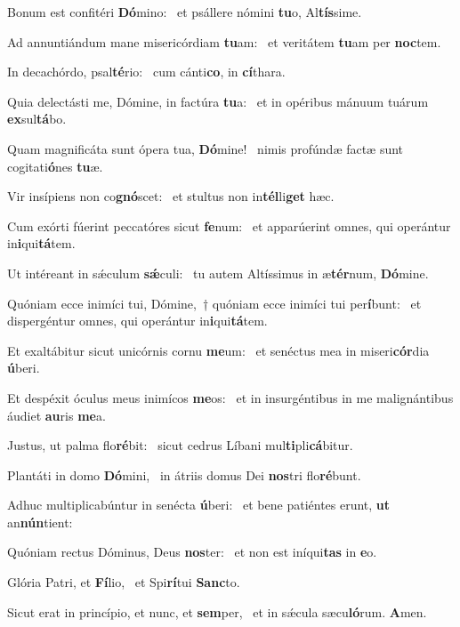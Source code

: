 \item Bonum est confitéri \textbf{Dó}mino:~\psstar{} et psállere nómini \textbf{tu}o, Al\textbf{tís}sime.

\item Ad annuntiándum mane misericórdiam \textbf{tu}am:~\psstar{} et veritátem \textbf{tu}am per \textbf{noc}tem.

\item In decachórdo, psal\textbf{té}rio:~\psstar{} cum cánti\textbf{co}, in \textbf{cí}thara.

\item Quia delectásti me, Dómine, in factúra \textbf{tu}a:~\psstar{} et in opéribus mánuum tuárum \textbf{ex}sul\textbf{tá}bo.

\item Quam magnificáta sunt ópera tua, \textbf{Dó}mine!~\psstar{} nimis profúndæ factæ sunt cogitati\textbf{ó}nes \textbf{tu}æ.

\item Vir insípiens non co\textbf{gnó}scet:~\psstar{} et stultus non in\textbf{tél}li\textbf{get} hæc.

\item Cum exórti fúerint peccatóres sicut \textbf{fe}num:~\psstar{} et apparúerint omnes, qui operántur in\textbf{i}qui\textbf{tá}tem.

\item Ut intéreant in sǽculum \textbf{sǽ}culi:~\psstar{} tu autem Altíssimus in æ\textbf{tér}num, \textbf{Dó}mine.

\item Quóniam ecce inimíci tui, Dómine,~† quóniam ecce inimíci tui per\textbf{í}bunt:~\psstar{} et dispergéntur omnes, qui operántur in\textbf{i}qui\textbf{tá}tem.

\item Et exaltábitur sicut unicórnis cornu \textbf{me}um:~\psstar{} et senéctus mea in miseri\textbf{cór}dia \textbf{ú}beri.

\item Et despéxit óculus meus inimícos \textbf{me}os:~\psstar{} et in insurgéntibus in me malignántibus áudiet \textbf{au}ris \textbf{me}a.

\item Justus, ut palma flo\textbf{ré}bit:~\psstar{} sicut cedrus Líbani mul\textbf{ti}pli\textbf{cá}bitur.

\item Plantáti in domo \textbf{Dó}mini,~\psstar{} in átriis domus Dei \textbf{nos}tri flo\textbf{ré}bunt.

\item Adhuc multiplicabúntur in senécta \textbf{ú}beri:~\psstar{} et bene patiéntes erunt, \textbf{ut} an\textbf{nún}tient:

\item Quóniam rectus Dóminus, Deus \textbf{nos}ter:~\psstar{} et non est iníqui\textbf{tas} in \textbf{e}o.

\item Glória Patri, et \textbf{Fí}lio,~\psstar{} et Spi\textbf{rí}tui \textbf{Sanc}to.

\item Sicut erat in princípio, et nunc, et \textbf{sem}per,~\psstar{} et in sǽcula sæcu\textbf{ló}rum. \textbf{A}men.
